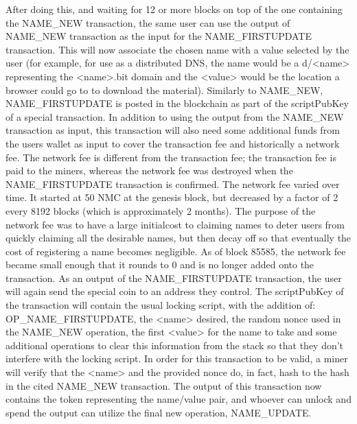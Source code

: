  After doing this, and waiting for 12 or more blocks on top of the one containing the NAME\_NEW transaction, the same user can use the output of NAME\_NEW transaction as the input for the NAME\_FIRSTUPDATE transaction. This will now associate the chosen name with a value selected by the user (for example, for use as a distributed DNS, the name would be a d/<name> representing the <name>.bit domain and the <value> would be the location a browser could go to to download the material). Similarly to NAME\_NEW, NAME\_FIRSTUPDATE is posted in the blockchain as part of the scriptPubKey of a special transaction. In addition to using the output from the NAME\_NEW transaction as input, this transaction will also need some additional funds from the users wallet as input to cover the transaction fee and historically a network fee. The network fee is different from the transaction fee; the transaction fee is paid to the miners, whereas the network fee was destroyed when the NAME\_FIRSTUPDATE transaction is confirmed. The network fee varied over time. It started at 50 NMC at the genesis block, but decreased by a factor of 2 every 8192 blocks (which is approximately 2 months). The purpose of the network fee was to have a large initialcost to claiming names to deter users from quickly claiming all the desirable names, but then decay off so that eventually the cost of registering a name becomes negligible. As of block 85585, the network fee became small enough that it rounds to 0 and is no longer added onto the transaction.  As an output of the NAME\_FIRSTUPDATE transaction, the user will again send the special coin to an address they control. The scriptPubKey of the transaction will contain the usual locking script, with the addition of: OP\_NAME\_FIRSTUPDATE, the <name> desired, the random nonce used in the NAME\_NEW operation, the first <value> for the name to take and some additional operations to clear this information from the stack so that they don't interfere with the locking script. In order for this transaction to be valid, a miner will verify that the <name> and the provided nonce do, in fact, hash to the hash in the cited NAME\_NEW transaction. The output of this transaction now contains the token representing the name/value pair, and whoever can unlock and spend the output can utilize the final new operation, NAME\_UPDATE.
